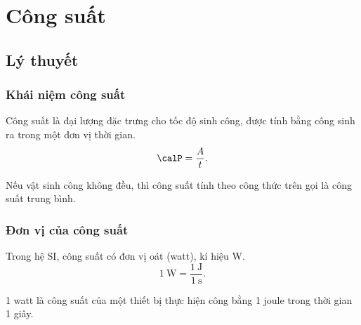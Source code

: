\let\lesson\undefined
\newcommand{\lesson}{\phantomlesson{Bài 16: Công suất}}
\chapter[Công suất]{Công suất}
\setcounter{section}{0}
\section{Lý thuyết}
\subsection{Khái niệm công suất}
Công suất là đại lượng đặc trưng cho tốc độ sinh công, được tính bằng công sinh ra trong một đơn vị thời gian.
\begin{equation*}
	\calP=\dfrac{A}{t}.
\end{equation*}

Nếu vật sinh công không đều, thì công suất tính theo công thức trên gọi là công suất trung bình. 
\subsection{Đơn vị của công suất}

Trong hệ SI, công suất có đơn vị oát (watt), kí hiệu W.
\begin{equation*}
	1\ \text{W}=\dfrac{1\ \text{J}}{1\ \text{s}}.
\end{equation*}

1 watt là công suất của một thiết bị thực hiện công bằng 1 joule  trong thời gian 1 giây.

